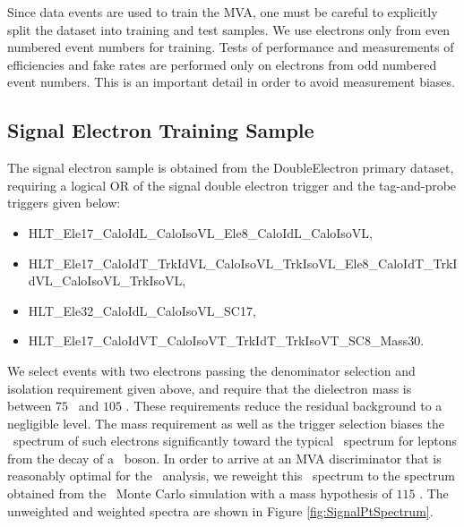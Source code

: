 \documentclass{cmspaper}
\begin{document}
Since data events are used to train the MVA, one must be careful to explicitly split the dataset into training and test samples. We use electrons only from even numbered event numbers for training. Tests of performance and measurements of efficiencies and fake rates are performed only on electrons from odd numbered event numbers. This is an important detail in order to avoid measurement biases.

\subsection{Signal Electron Training Sample}
The signal electron sample is obtained from the DoubleElectron primary dataset, requiring a logical OR of the signal double electron trigger and the tag-and-probe triggers given below:

\begin{itemize}
  \item HLT\_Ele17\_CaloIdL\_CaloIsoVL\_Ele8\_CaloIdL\_CaloIsoVL,
  \item HLT\_Ele17\_CaloIdT\_TrkIdVL\_CaloIsoVL\_TrkIsoVL\_Ele8\_CaloIdT\_TrkIdVL\_CaloIsoVL\_TrkIsoVL,
  \item HLT\_Ele32\_CaloIdL\_CaloIsoVL\_SC17,
  \item HLT\_Ele17\_CaloIdVT\_CaloIsoVT\_TrkIdT\_TrkIsoVT\_SC8\_Mass30.
\end{itemize}

We select events with two electrons passing the denominator selection and isolation requirement given above, and require that the dielectron mass is between $75$ \GeV\ and $105$ \GeV. These requirements reduce the residual background to a negligible level. The mass requirement as well as the trigger selection biases the \pt\ spectrum of such electrons significantly toward the typical \pt\ spectrum for leptons from the decay of a \Z\ boson. In order to arrive at an MVA discriminator that is reasonably optimal for the \hww\ analysis, we reweight this \pt\ spectrum to the spectrum obtained from the \hww\ Monte Carlo simulation with a mass hypothesis of $115$ \GeV. The unweighted and weighted spectra are shown in Figure \ref{fig:SignalPtSpectrum}. 
\end{document}
